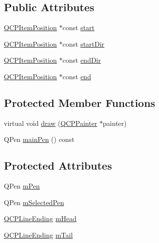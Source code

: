 \subsection*{Public Attributes}
\begin{DoxyCompactItemize}
\item 
\hyperlink{class_q_c_p_item_position}{Q\+C\+P\+Item\+Position} $\ast$const \hyperlink{class_q_c_p_item_curve_a20c3b5ea31c33764f4f30c2ec7ae518b}{start}
\item 
\hyperlink{class_q_c_p_item_position}{Q\+C\+P\+Item\+Position} $\ast$const \hyperlink{class_q_c_p_item_curve_aa124bf66c09cc51c627fb49db8bf8a7b}{start\+Dir}
\item 
\hyperlink{class_q_c_p_item_position}{Q\+C\+P\+Item\+Position} $\ast$const \hyperlink{class_q_c_p_item_curve_a28181a9dee9cc3c3da83a883221bd2d0}{end\+Dir}
\item 
\hyperlink{class_q_c_p_item_position}{Q\+C\+P\+Item\+Position} $\ast$const \hyperlink{class_q_c_p_item_curve_a24ecbb195b32a08b42b61c2cf08a1b4d}{end}
\end{DoxyCompactItemize}
\subsection*{Protected Member Functions}
\begin{DoxyCompactItemize}
\item 
virtual void \hyperlink{class_q_c_p_item_curve_a56cb5b72cd02db2eda598274a39839a9}{draw} (\hyperlink{class_q_c_p_painter}{Q\+C\+P\+Painter} $\ast$painter)
\item 
Q\+Pen \hyperlink{class_q_c_p_item_curve_a8089126f5645b6edfbaddea49d1e8390}{main\+Pen} () const 
\end{DoxyCompactItemize}
\subsection*{Protected Attributes}
\begin{DoxyCompactItemize}
\item 
Q\+Pen \hyperlink{class_q_c_p_item_curve_a7ef92988d1db2e4d0311e34c0a57fe42}{m\+Pen}
\item 
Q\+Pen \hyperlink{class_q_c_p_item_curve_ab22cbab261b20be5aa8e4ca252149246}{m\+Selected\+Pen}
\item 
\hyperlink{class_q_c_p_line_ending}{Q\+C\+P\+Line\+Ending} \hyperlink{class_q_c_p_item_curve_af2cc26ff199570940dc96f5ec19a13f8}{m\+Head}
\item 
\hyperlink{class_q_c_p_line_ending}{Q\+C\+P\+Line\+Ending} \hyperlink{class_q_c_p_item_curve_af1dca285b97e3f5b892dab827a79f327}{m\+Tail}
\end{DoxyCompactItemize}
